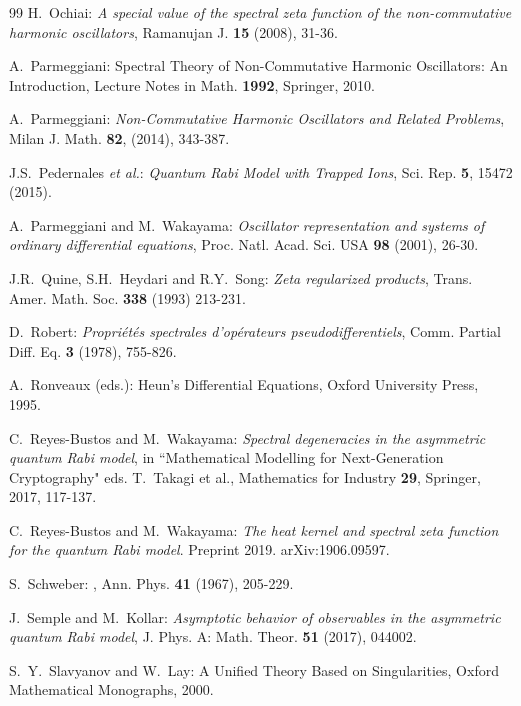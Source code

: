\documentclass[11pt]{article}
\numberwithin{equation}{section}
\theoremstyle{plain}
\theoremstyle{definition}
\theoremstyle{remark}
\begin{document}
\begin{thebibliography}{99}
H.~Ochiai:
\textit{A special value of the spectral zeta function of the non-commutative harmonic oscillators},
Ramanujan J. \textbf{15} (2008), 31-36.

  A.~Parmeggiani:
  Spectral Theory of Non-Commutative Harmonic Oscillators: An Introduction,
  Lecture Notes in Math. \textbf{1992}, Springer, 2010.

  A.~Parmeggiani:
\textit{Non-Commutative Harmonic Oscillators and Related Problems}, Milan J. Math. \textbf{82}, (2014), 343-387.

  J.S.~Pedernales {\it et al.}:
  \textit{Quantum Rabi Model with Trapped Ions},
  Sci. Rep. \textbf{5}, 15472 (2015).

  A.~Parmeggiani and M.~Wakayama:
  \textit{Oscillator representation and systems of ordinary differential equations},
  Proc. Natl. Acad. Sci. USA \textbf{98} (2001), 26-30.

  J.R.~Quine, S.H.~Heydari and R.Y.~Song:
  \textit{Zeta regularized products}, Trans. Amer. Math. Soc. \textbf{338} (1993) 213-231.

D.~Robert:
\textit{Propri\'et\'es spectrales d'op\'erateurs pseudodifferentiels}, Comm. Partial Diff. Eq. \textbf{3} (1978), 755-826.

  A.~Ronveaux (eds.):
  Heun's Differential Equations, Oxford University Press, 1995.

  C.~Reyes-Bustos and M.~Wakayama:
  \textit{Spectral degeneracies in the asymmetric quantum Rabi model}, in ``Mathematical Modelling for Next-Generation Cryptography" eds. T.~Takagi et al.,  Mathematics for Industry \textbf{29}, Springer, 2017, 117-137.

  C.~Reyes-Bustos and M.~Wakayama:
  \textit{The heat kernel and spectral zeta function for the quantum Rabi model}.
  Preprint 2019. arXiv:1906.09597.

  S.~Schweber:
  , Ann. Phys. \textbf{41} (1967), 205-229.

J.~Semple and M.~Kollar:
\textit{Asymptotic behavior of observables in the asymmetric quantum Rabi model},
J. Phys. A: Math. Theor. \textbf{51} (2017), 044002.

  S.~Y.~Slavyanov and W.~Lay:
  A Unified Theory Based on Singularities, Oxford Mathematical Monographs, 2000.


\end{thebibliography}
\end{document}
